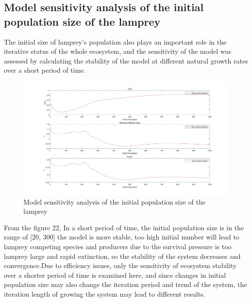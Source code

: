 \documentclass[12pt]{article}  %
\begin{document}
\subsection{Model sensitivity analysis of the initial population size of the lamprey}
\par
The initial size of lamprey's population also plays an important role in the iterative status of the whole ecosystem, and the sensitivity of the model was assessed by calculating the stability of the model at different natural growth rates over a short period of time.\par
\begin{figure}[htbp]  %
	\centering  %
	\includegraphics[width=.9\textwidth]{img/ipr-1707158411741-12.jpg} %
	\caption{Model sensitivity analysis of the initial population size of the lamprey} %

\end{figure}
\par
From the figure 22, In a short period of time, the initial population size is in the range of [20, 300] the model is more stable, too high initial number will lead to lamprey competing species and producers due to the survival pressure is too lamprey large and rapid extinction, so the stability of the system decreases and convergence.Due to efficiency issues, only the sensitivity of ecosystem stability over a shorter period of time is examined here, and since changes in initial population size may also change the iteration period and trend of the system, the iteration length of growing the system may lead to different results.
\par
\end{document}
